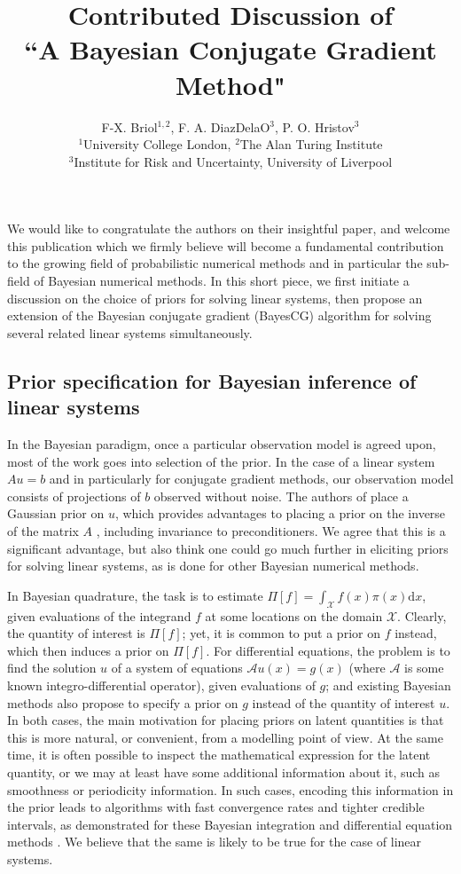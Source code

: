 \documentclass[twoside]{article}
\title{Contributed Discussion of \\``A Bayesian Conjugate Gradient Method"}
\author{F-X. Briol$^{1,2}$, F. A. DiazDelaO$^{3}$, P. O. Hristov$^{3}$\\ $^{1}$University College London, $^{2}$The Alan Turing Institute \\ $^{3}$Institute for Risk and Uncertainty, University of Liverpool}
\begin{document}
\maketitle
		We would like to congratulate the authors on their insightful paper, and welcome this publication which we firmly believe will become a fundamental contribution to the growing field of probabilistic numerical methods and in particular the sub-field of Bayesian numerical methods. In this short piece, we first initiate a discussion on the choice of priors for solving linear systems, then propose an extension of the Bayesian conjugate gradient (BayesCG) algorithm for solving several related linear systems simultaneously.
		
	\subsection*{Prior specification for Bayesian inference of linear systems}

		In the Bayesian paradigm, once a particular observation model is agreed upon, most of the work goes into selection of the prior. In the case of a linear system $A u = b$ and in particularly for conjugate gradient methods, our observation model consists of projections of $b$ observed without noise. The authors of \cite{Cockayne2019} place a Gaussian prior on $u$, which provides advantages to placing a prior on the inverse of the matrix $A$ \cite{Hen15}, including invariance to preconditioners. We agree that this is a significant advantage, but also think one could go much further in eliciting priors for solving linear systems, as is done for other Bayesian numerical methods. 

		In Bayesian quadrature, the task is to estimate $\Pi[f] = \int_{\mathcal{X}} f(x) \pi(x) \mathrm{d}x$, given evaluations of the integrand $f$ at some locations on the domain $\mathcal{X}$. Clearly, the quantity of interest is 
		$\Pi[f]$; yet, it is common to put a prior on $f$ instead, which then induces a prior on $\Pi[f]$. For differential equations, the problem is to find the solution $u$ of a system of equations $\mathcal{A} u(x) =g(x)$ (where $\mathcal{A}$ is some known integro-differential operator), given evaluations of $g$; and existing Bayesian methods also propose to specify a prior on $g$ instead of the quantity of interest $u$.
		In both cases, the main motivation for placing priors on latent quantities is that this is more natural, or convenient, from a modelling point of view. At the same time, it is often possible to inspect the mathematical expression for the latent quantity, or we may at least have some additional information about it, such as smoothness or periodicity information. In such cases, encoding this information in the prior leads to algorithms with fast convergence rates and tighter credible intervals, as demonstrated for these Bayesian integration and differential equation methods \cite{Cockayne2016,Briol2019PI}. We believe that the same is likely to be true for the case of linear systems.
		
\end{document}
